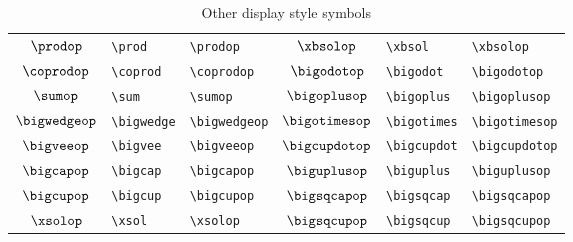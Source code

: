 \documentclass[captions=tableheading]{scrartcl}
\begin{document}
\begin{table}
  \caption{Other display style symbols}
  \label{tab:small-integrals}
  \centering
  \begin{tabular}[c]{cll@{\hskip 3em}cll}
    \toprule
    $\prodop$ & \verb|\prod| & \verb|\prodop| &
    $\xbsolop$ & \verb|\xbsol| & \verb|\xbsolop| \\
    $\coprodop$ & \verb|\coprod| & \verb|\coprodop| &
    $\bigodotop$ & \verb|\bigodot| & \verb|\bigodotop| \\
    $\sumop$ & \verb|\sum| & \verb|\sumop| &
    $\bigoplusop$ & \verb|\bigoplus| & \verb|\bigoplusop| \\
    $\bigwedgeop$ & \verb|\bigwedge| & \verb|\bigwedgeop| &
    $\bigotimesop$ & \verb|\bigotimes| & \verb|\bigotimesop| \\
    \addlinespace
    $\bigveeop$ & \verb|\bigvee| & \verb|\bigveeop| &
    $\bigcupdotop$ & \verb|\bigcupdot| & \verb|\bigcupdotop| \\
    $\bigcapop$ & \verb|\bigcap| & \verb|\bigcapop| &
    $\biguplusop$ & \verb|\biguplus| & \verb|\biguplusop| \\
    $\bigcupop$ & \verb|\bigcup| & \verb|\bigcupop| &
    $\bigsqcapop$ & \verb|\bigsqcap| & \verb|\bigsqcapop| \\
    $\xsolop$ & \verb|\xsol| & \verb|\xsolop| &
    $\bigsqcupop$ & \verb|\bigsqcup| & \verb|\bigsqcupop| \\
    \bottomrule
  \end{tabular}
\end{table}
\end{document}
